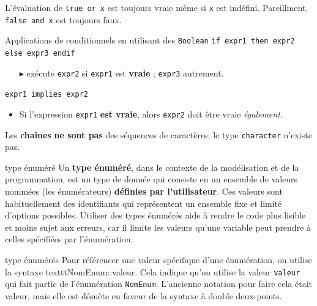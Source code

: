 \documentclass[16pt]{report}
\begin{document}
\begin{multicols*}{2}
        \begin{note}{}{}
            L'évaluation de \textcolor{myb}{\texttt{true or x}} est toujours vraie même si \texttt{x} est indéfini. 
            Pareillment, \textcolor{myb}{\texttt{false and x}} est toujours faux.   
        \end{note}


        \begin{EExample}{Applications de conditionnels en utilisant des \texttt{Boolean}  }{}
            \texttt{if expr1 then expr2 else expr3 endif} 
            \begin{itemize}
                \item[$\blacktriangleright$] exécute \texttt{expr2} si \texttt{expr1} est \textbf{vraie} ; 
                    \texttt{expr3} autrement.   
            \end{itemize}           
            \texttt{expr1 implies expr2}        
            \begin{itemize}
                \item Si l'expression \texttt{expr1} \textbf{est vraie}, alors \texttt{expr2} doit être vraie 
                    \textit{également}.   
            \end{itemize}

        \end{EExample}
        \begin{note}{}{}
            Les \textbf{chaînes} \textbf{ne sont pas} des séquences de caractères; le type \texttt{character} 
            n'existe pas. 
        \end{note}


        \begin{Definitionx}{type énuméré}{}
            Un \textbf{type énuméré}, dans le contexte de la modélisation et de la programmation,
            est un type de donnée 
            qui consiste en un ensemble de valeurs nommées (les énumérateurs) \textbf{définies par l'utilisateur}. 
            Ces valeurs sont habituellement des identifiants qui représentent un ensemble fixe et 
            limité d'options possibles. Utiliser des types énumérés aide à rendre le code plus lisible 
            et moins sujet aux erreurs, car il limite les valeurs qu'une variable peut prendre à celles 
            spécifiées par l'énumération.           
        \end{Definitionx}

        \begin{Syntaxe}{type énumérés}{}
            Pour référencer une valeur spécifique d'une énumération, on utilise la syntaxe 
            \textcolor{myb}{texttt{NomEnum::valeur}}. 
            Cela indique qu'on utilise la valeur \textcolor{myb}{\texttt{valeur}} qui fait partie de l'énumération 
            \textcolor{myb}{\texttt{NomEnum}}.
            L'ancienne notation pour faire cela était valeur, mais elle est désuète en faveur de la syntaxe à 
            double deux-points.
        \end{Syntaxe}       



\end{multicols*}
\end{document}
